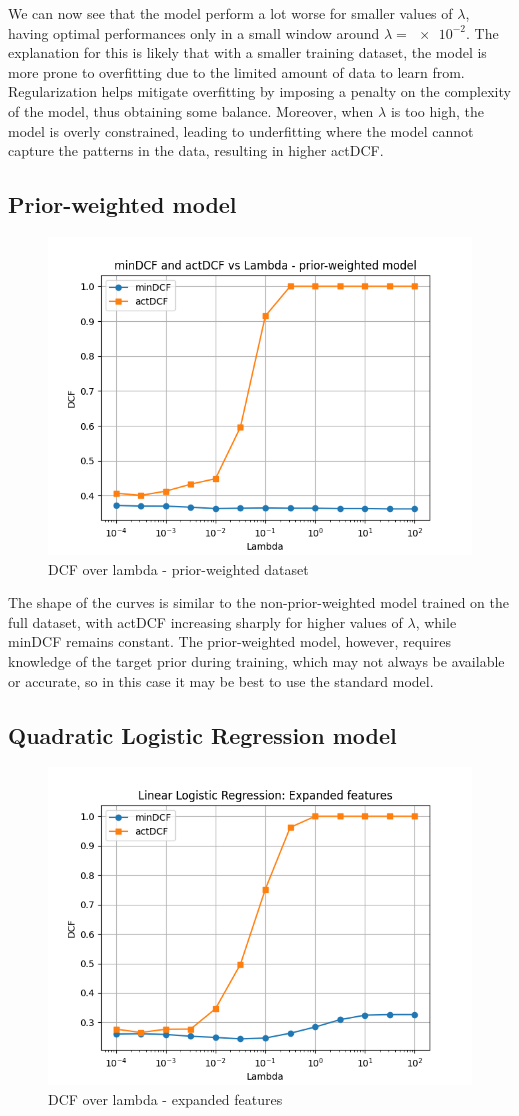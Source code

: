 \documentclass[12pt, a4paper]{article}
\begin{document}
We can now see that the model perform a lot worse for smaller values of $\lambda$, having optimal performances only in a small window around $\lambda = \num{e-2}$.
The explanation for this is likely that with a smaller training dataset, the model is more prone to overfitting due to the limited amount of data to learn from. Regularization helps mitigate overfitting by imposing a penalty on the complexity of the model, thus obtaining some balance. Moreover, when $\lambda$ is too high, the model is overly constrained, leading to underfitting where the model cannot capture the patterns in the data, resulting in higher actDCF.

\subsection{Prior-weighted model}

\begin{figure}[ht]
	\centering
	\includegraphics[width=.4\textwidth]{project08/dcf_lambda_wheighted}
	\caption{DCF over lambda - prior-weighted dataset}
	\label{fig:LR_priorWeighted}
\end{figure}

The shape of the curves is similar to the non-prior-weighted model trained on the full dataset, with actDCF increasing sharply for higher values of $\lambda$, while minDCF remains constant. The prior-weighted model, however, requires knowledge of the target prior during training, which may not always be available or accurate, so in this case it may be best to use the standard model. 

\subsection{Quadratic Logistic Regression model}

\begin{figure}[ht]
	\centering
	\includegraphics[width=.4\textwidth]{project08/dcf_lambda_expandedFeatures}
	\caption{DCF over lambda - expanded features}
	\label{fig:LR_expandedFeatures}
\end{figure}
\end{document}
